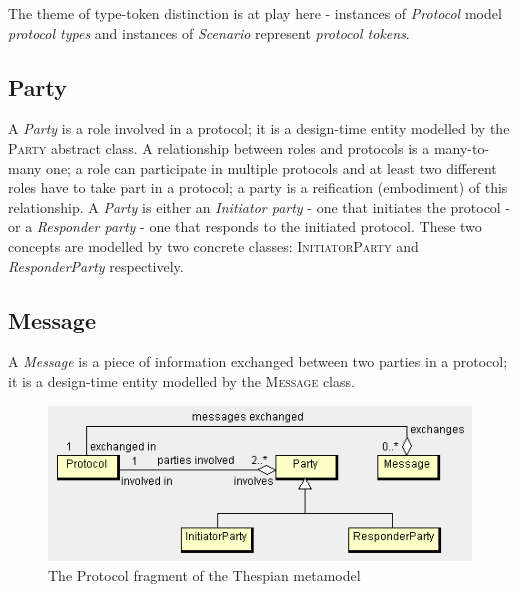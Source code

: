 The theme of type-token distinction is at play here - instances of \textit{Protocol} model \textit{protocol types} and instances of \textit{Scenario} represent \textit{protocol tokens}.

\subsection*{Party}

A \textit{Party} is a role involved in a protocol; it is a design-time entity modelled by the \textsc{Party} abstract class.
A relationship between roles and protocols is a many-to-many one; a role can participate in multiple protocols and at least two different roles have to take part in a protocol; a party is a reification (embodiment) of this relationship.
A \textit{Party} is either an \textit{Initiator party} - one that initiates the protocol - or a \textit{Responder party} - one that responds to the initiated protocol. These two concepts are modelled by two concrete classes: \textsc{InitiatorParty} and \textsl{ResponderParty} respectively.

\subsection*{Message}

A \textit{Message} is a piece of information exchanged between two parties in a protocol; it is a design-time entity modelled by the \textsc{Message} class.

\begin{figure}[ht]
	\centering
	\includegraphics[width=\textwidth]{images/thespian-protocol-metamodel.png}
	\caption{The Protocol fragment of the Thespian metamodel}
	\label{figure:thespian-protocol-metamodel}
\end{figure}

